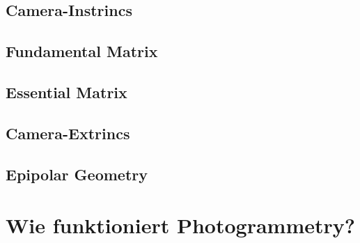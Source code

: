 \subsection{Camera-Instrincs}
\subsection{Fundamental Matrix}
\subsection{Essential Matrix}
\subsection{Camera-Extrincs}
\subsection{Epipolar Geometry}

\section{Wie funktioniert Photogrammetry?}
